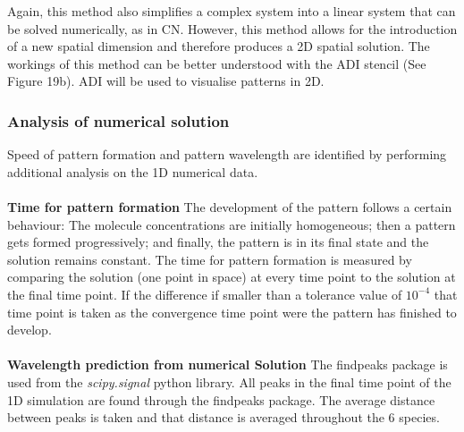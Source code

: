 Again, this method also simplifies a complex system into a linear system that can be solved numerically, as in CN. However, this method allows for the introduction of a new spatial dimension and therefore produces a 2D spatial solution. The workings of this method can be better understood with the ADI stencil (See Figure 19b). ADI will be used to visualise patterns in 2D.
\subsubsection{Analysis of numerical solution}
Speed of pattern formation and pattern wavelength are identified by performing additional analysis on the 1D numerical data.  \\\\
\textbf{Time for pattern formation}
The development of the pattern follows a certain behaviour: The molecule concentrations are initially homogeneous; then a pattern gets formed progressively; and finally, the pattern is in its final state and the solution remains constant.  The time for pattern formation is measured by comparing the solution (one point in space) at every time point to the solution at the final time point. If the difference if smaller than a tolerance value of $10^{-4}$ that time point is taken as the convergence time point were the pattern has finished to  develop. \\\\
\textbf{Wavelength prediction from numerical Solution}
The findpeaks package is used from the \textit{scipy.signal} python library. All peaks in the final time point of the 1D simulation are found through the findpeaks package. The average distance between peaks is taken and that distance is averaged throughout the 6 species.

%

